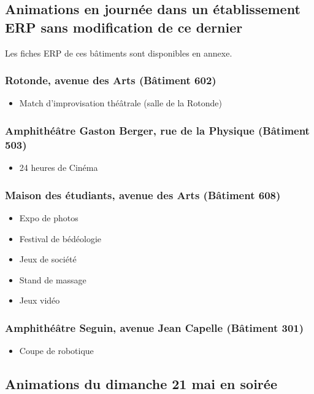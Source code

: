 \documentclass[hidelinks, paper=a4, fontsize=13pt]{report}
\begin{document}
\subsection{Animations en journée dans un établissement ERP sans modification de ce dernier}

Les fiches ERP de ces bâtiments sont disponibles en annexe.

\subsubsection{Rotonde, avenue des Arts (Bâtiment 602)}
\begin{itemize}
\item Match d’improvisation théâtrale (salle de la Rotonde)
\end{itemize}

\subsubsection{Amphithéâtre Gaston Berger, rue de la Physique (Bâtiment 503)}
\begin{itemize}
\item 24 heures de Cinéma
\end{itemize}

\subsubsection{Maison des étudiants, avenue des Arts (Bâtiment 608)}
\begin{itemize}
\item Expo de photos
\item Festival de bédéologie
\item Jeux de société
\item Stand de massage
\item Jeux vidéo
\end{itemize}

\subsubsection{Amphithéâtre Seguin, avenue Jean Capelle (Bâtiment 301)}
\begin{itemize}
\item Coupe de robotique
\end{itemize}

\subsection{Animations du dimanche 21 mai en soirée}
\end{document}
